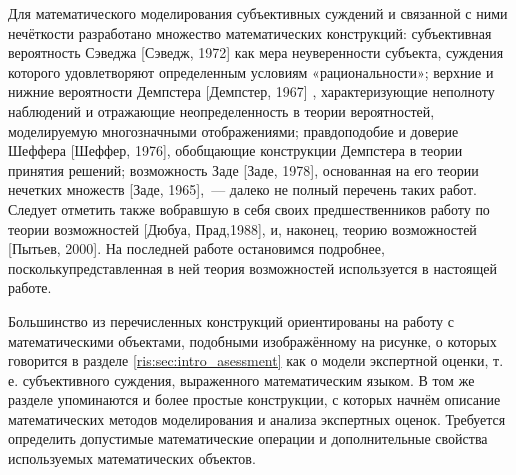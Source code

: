 
Для математического моделирования субъективных суждений и связанной с ними нечёткости разработано множество математических конструкций: 
субъективная вероятность Сэведжа [Сэведж, 1972]  как мера неуверенности субъекта, суждения которого удовлетворяют определенным условиям «рациональности»; верхние и нижние вероятности Демпстера [Демпстер, 1967] , характеризующие неполноту наблюдений и отражающие неопределенность в теории вероятностей, моделируемую многозначными отображениями; правдоподобие и доверие Шеффера [Шеффер, 1976], обобщающие конструкции Демпстера в теории принятия решений; возможность Заде [Заде, 1978], основанная на его теории нечетких множеств [Заде, 1965],~--- далеко не полный перечень таких работ. Следует отметить также вобравшую в себя своих предшественников работу по теории возможностей [Дюбуа, Прад,1988], и, наконец, теорию возможностей [Пытьев, 2000]. На последней работе остановимся подробнее, посколькупредставленная в ней теория возможностей используется в настоящей работе.

Большинство из перечисленных конструкций ориентированы на работу с математическими объектами, подобными изображённому на рисунке, о которых говорится в разделе \ref{ris:sec:intro_asessment} как о модели экспертной оценки, т.\,е. субъективного суждения,  выраженного математическим языком.  В том же разделе упоминаются и более простые конструкции, с которых начнём описание математических методов моделирования и анализа экспертных оценок. Требуется определить допустимые математические операции и дополнительные свойства используемых математических объектов.

